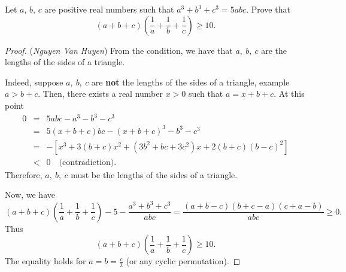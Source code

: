 \documentclass[12pt,a4paper]{book}
\begin{document}
\begin{pro_no_count}
Let $a,\,b,\,c$ are positive real numbers such that $a^3+b^3+c^3 = 5abc.$ Prove that
\[(a+b+c)\left(\frac{1}{a}+\frac{1}{b}+\frac{1}{c}\right) \geqslant 10.\]
\end{pro_no_count}

\begin{proof}
(\textit{Nguyen Van Huyen}) From the condition, we have that $a, \ b, \ c$ are the lengths of the sides of a triangle.

Indeed, suppose $a, \ b, \ c$ are \textbf{not} the lengths of the sides of a triangle, example $a>b+c.$ Then, there exists a real number $x>0$ such that $a=x+b+c.$ At this point
\[\begin{array}{lcl}
0 & = & 5 abc - a^3 - b^3 - c^3 \\ 
& = & 5(x+b+c)bc  - (x+b+c)^3 - b^3 - c^3 \\
& = & -[x^3 + 3(b+c)x^2+(3b^2+bc+3c^2)x+2(b+c)(b-c)^2] \\
& < & 0 \quad \text{(contradiction)}.
\end{array}\]
Therefore, $a, \ b, \ c$ must be the lengths of the sides of a triangle.

Now, we have
\[(a+b+c)\left(\frac{1}{a}+\frac{1}{b}+\frac{1}{c}\right) - 5 - \frac{a^3+b^3+c^3}{abc} = \frac{(a+b-c)(b+c-a)(c+a-b)}{abc} \ge 0.\]
Thus
\[(a+b+c)\left(\frac{1}{a}+\frac{1}{b}+\frac{1}{c}\right) \ge 10.\]
The equality holds for $a=b=\frac{c}{2}$ (or any cyclic permutation).
\end{proof}
\end{document}
